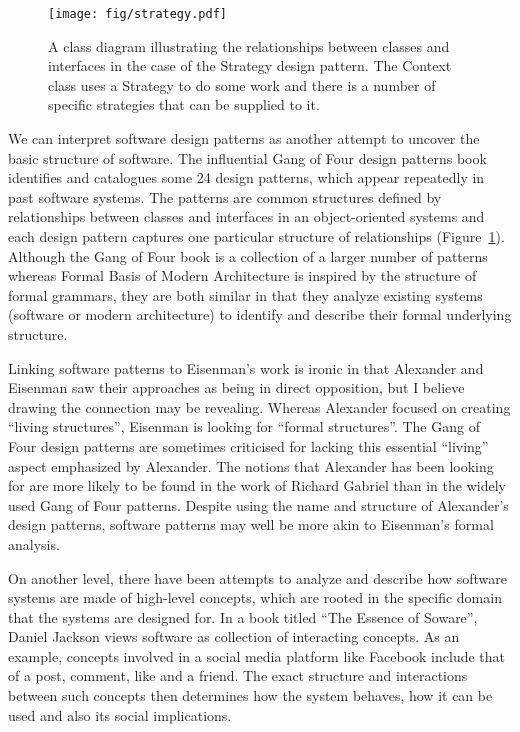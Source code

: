 \begin{figure}
\centering
\texttt{[image: fig/strategy.pdf]}
\caption{A class diagram illustrating the relationships between classes and interfaces in the
case of the Strategy design pattern. The Context class uses a Strategy to do some work and
there is a number of specific strategies that can be supplied to it.}
\label{fig:strategy}
\end{figure}

We can interpret software design patterns as another attempt to uncover the basic
structure of software. The influential Gang of Four design patterns book identifies
and catalogues some 24 design patterns, which appear repeatedly in past software systems. The
patterns are common structures defined by relationships between classes and interfaces in an
object-oriented systems and each design pattern captures one particular structure
of relationships (Figure~\ref{fig:strategy}). Although the Gang of Four book is a collection of
a larger number of patterns whereas Formal Basis of Modern Architecture is inspired by the structure
of formal grammars, they are both similar in that they analyze existing systems (software or modern
architecture) to identify and describe their formal underlying structure.

Linking software patterns to Eisenman's work is ironic in that Alexander and Eisenman saw
their approaches as being in direct opposition, but I believe drawing the connection
may be revealing. Whereas Alexander focused on creating ``living structures'', Eisenman is looking
for ``formal structures''. The Gang of Four design patterns are sometimes criticised for lacking
this essential ``living'' aspect emphasized by Alexander. The notions that Alexander has been
looking for are more likely to be found in the work of Richard Gabriel
than in the widely used Gang of Four patterns. Despite using the name and structure of Alexander's
design patterns, software patterns may well be more akin to Eisenman's formal analysis.

On another level, there have been attempts to analyze and describe how software systems are made of
high-level concepts, which are rooted in the specific domain that the systems are designed
for. In a book titled ``The Essence of Soware'', Daniel Jackson views software
as collection of interacting concepts. As an example, concepts involved in a social media
platform like Facebook include that of a post, comment, like and a friend. The exact structure
and interactions between such concepts then determines how the system behaves, how it can be
used and also its social implications.

